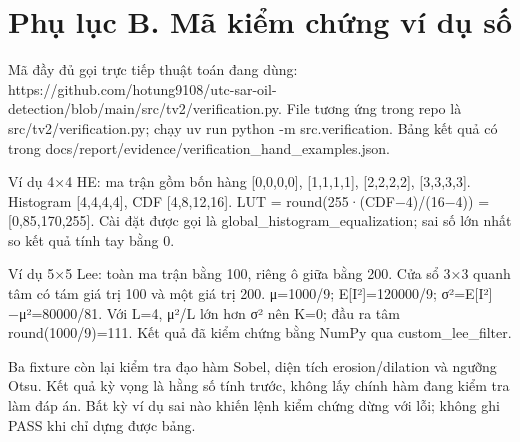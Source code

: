 \documentclass[13pt,a4paper]{extreport}
\begin{document}
\section*{Phụ lục B. Mã kiểm chứng ví dụ số}
Mã đầy đủ gọi trực tiếp thuật toán đang dùng: https://github.com/hotung9108/utc-sar-oil-detection/blob/main/src/tv2/verification.py. File tương ứng trong repo là src/tv2/verification.py; chạy uv run python -m src.verification. Bảng kết quả có trong docs/report/evidence/verification\_hand\_examples.json.
\par
Ví dụ 4×4 HE: ma trận gồm bốn hàng [0,0,0,0], [1,1,1,1], [2,2,2,2], [3,3,3,3]. Histogram [4,4,4,4], CDF [4,8,12,16]. LUT = round(255·(CDF−4)/(16−4)) = [0,85,170,255]. Cài đặt được gọi là global\_histogram\_equalization; sai số lớn nhất so kết quả tính tay bằng 0.
\par
Ví dụ 5×5 Lee: toàn ma trận bằng 100, riêng ô giữa bằng 200. Cửa sổ 3×3 quanh tâm có tám giá trị 100 và một giá trị 200. μ=1000/9; E[I²]=120000/9; σ²=E[I²]−μ²=80000/81. Với L=4, μ²/L lớn hơn σ² nên K=0; đầu ra tâm round(1000/9)=111. Kết quả đã kiểm chứng bằng NumPy qua custom\_lee\_filter.
\par
Ba fixture còn lại kiểm tra đạo hàm Sobel, diện tích erosion/dilation và ngưỡng Otsu. Kết quả kỳ vọng là hằng số tính trước, không lấy chính hàm đang kiểm tra làm đáp án. Bất kỳ ví dụ sai nào khiến lệnh kiểm chứng dừng với lỗi; không ghi PASS khi chỉ dựng được bảng.
\par
\clearpage
\end{document}
